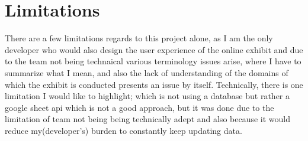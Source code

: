 \section{Limitations}

There are a few limitations regards to this project alone, as I am the only developer who would also design the user experience of the online exhibit and due to the team not being technaical various terminology issues arise, where I have to summarize what I mean, and also the lack of understanding of the domains of which the exhibit is conducted presents an issue by itself. Technically, there is one limitation I would like to highlight; which is not using a database but rather a google sheet api which is not a good approach, but it was done due to the limitation of team not being being technically adept and also because it would reduce my(developer's) burden to constantly keep updating data. 
